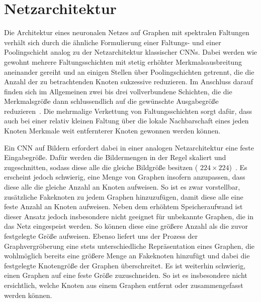 \section{Netzarchitektur}
\label{spektrale_netzarchitektur}

Die Architektur eines neuronalen Netzes auf Graphen mit spektralen Faltungen verhält sich durch die ähnliche Formulierung einer Faltungs- und einer Poo\-ling\-sch\-icht analog zu der Netzarchitektur klassischer \glspl{CNN}.
Dabei werden wie gewohnt mehrere Faltungsschichten mit stetig erhöhter Merkmalsausbreitung aneinander gereiht und an einigen Stellen über Poolingschichten getrennt, die die Anzahl der zu betrachtenden Knoten sukzessive reduzieren.
Im Anschluss darauf finden sich im Allgemeinen zwei bis drei vollverbundene Schichten, die die Merkmalsgröße dann schlussendlich auf die gewünschte Ausgabegröße reduzieren~\cite{Nielsen}.
Die mehrmalige Verkettung von Faltungsschichten sorgt dafür, dass auch bei einer relativ kleinen Faltung über die lokale Nachbarschaft eines jeden Knoten Merkmale weit entfernterer Knoten gewonnen werden können.

Ein \gls{CNN} auf Bildern erfordert dabei in einer analogen Netzarchitektur eine feste Eingabegröße.
Dafür werden die Bildermengen in der Regel skaliert und zugeschnitten, sodass diese alle die gleiche Bildgröße besitzen (\zB{} $224 \times 224$)~\cite{spp}.
Es erscheint jedoch schwierig, eine Menge von Graphen insofern anzupassen, dass diese alle die gleiche Anzahl an Knoten aufweisen.
So ist es zwar vorstellbar, zusätzliche Fakeknoten zu jedem Graphen hinzuzufügen, damit diese alle eine feste Anzahl an Knoten aufweisen.
Neben dem erhöhtem Speicheraufwand ist dieser Ansatz jedoch insbesondere nicht geeignet für unbekannte Graphen, die in das Netz eingespeist werden.
So können diese \evtl{} eine größere Anzahl als die zuvor festgelegte Größe aufweisen.
Ebenso liefert uns der Prozess der Graphvergröberung eine stets unterschiedliche Repräsentation eines Graphen, die wohlmöglich bereits eine größere Menge an Fakeknoten hinzufügt und dabei die festgelegte Knotengröße der Graphen überschreitet.
Es ist weiterhin schwierig, einen Graphen auf eine feste Größe zuzuschneiden.
So ist es insbesondere nicht ersichtlich, welche Knoten aus einem Graphen entfernt oder zusammengefasst werden können.

